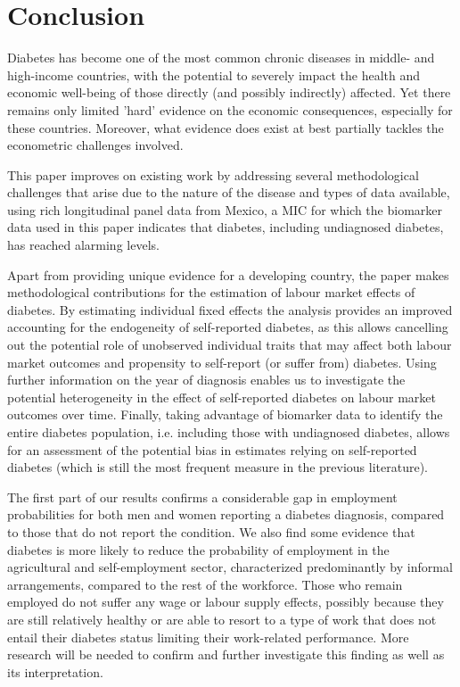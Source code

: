 \section{\label{sec:cha_4_conclusion}Conclusion}

Diabetes has become one of the most common chronic diseases in middle- and high-income countries, with the potential to severely impact the health and economic well-being of those directly (and possibly indirectly) affected. Yet there remains only limited 'hard' evidence on the economic consequences, especially for these countries. Moreover, what evidence does exist at best partially tackles the econometric challenges involved. 

This paper improves on existing work by addressing several methodological challenges that arise due to the nature of the disease and types of data available, using rich longitudinal panel data from Mexico, a \ac{MIC} for which the biomarker data used in this paper indicates that diabetes, including undiagnosed diabetes, has reached alarming levels.

Apart from providing unique evidence for a developing country, the paper makes methodological contributions for the estimation of labour market effects of diabetes. By estimating individual fixed effects the analysis provides an improved accounting for the endogeneity of self-reported diabetes, as this allows cancelling out the potential role of unobserved individual traits that may affect both labour market outcomes and propensity to self-report (or suffer from) diabetes. Using further information on the year of diagnosis enables us to investigate the potential heterogeneity in the effect of self-reported diabetes on labour market outcomes over time. Finally, taking advantage of biomarker data to identify the entire diabetes population, i.e. including those with undiagnosed diabetes, allows for an assessment of the potential bias in estimates relying on self-reported diabetes (which is still the most frequent measure in the previous literature).

The first part of our results confirms a considerable gap in employment probabilities for both men and women reporting a diabetes diagnosis, compared to those that do not report the condition. We also find some evidence that diabetes is more likely to reduce the probability of employment in the agricultural and self-employment sector, characterized predominantly by informal arrangements, compared to the rest of the workforce. Those who remain employed do not suffer any wage or labour supply effects, possibly because they are still relatively healthy or are able to resort to a type of work that does not entail their diabetes status limiting their work-related performance. More research will be needed to confirm and further investigate this finding as well as its interpretation. 

